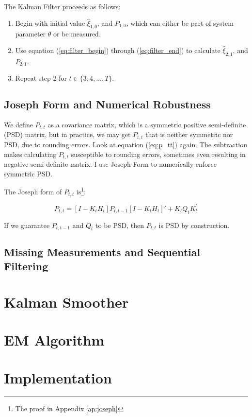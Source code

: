 \documentclass[12pt]{article}
\newenvironment{boenumerate}
    {\begin{enumerate}\renewcommand\labelenumi{\textbf\theenumi}}
    {\end{enumerate}}
\numberwithin{equation}{section}
\begin{document}
The Kalman Filter proceeds as follows:

\begin{boenumerate}
    \item Begin with initial value $\hat{\xi}_{1,0}$, and $P_{1,0}$, which can either be part of system parameter $\theta$ or be measured. 
    \item Use equation (\ref{eq:filter_begin}) through (\ref{eq:filter_end}) to calculate $\hat{\xi}_{2,1}$, and $P_{2,1}$.
    \item Repeat step 2 for $t\in\{3, 4, ..., T\}$.
\end{boenumerate}

\subsection{Joseph Form and Numerical Robustness}

We define $P_{t,t}$ as a covariance matrix, which is a symmetric positive semi-definite (PSD) matrix, but in practice, we may get $P_{t,t}$ that is neither symmetric nor PSD, due to rounding errors. Look at equation (\ref{eq:p_tt}) again. The subtraction makes calculating $P_{t,t}$ susceptible to rounding errors, sometimes even resulting in negative semi-definite matrix. I use Joseph Form to numerically enforce symmetric PSD. 

The Joseph form of $P_{t,t}$ is\footnote{The proof in Appendix \ref{ap:joseph}}:

\[
    P_{t,t} = [I - K_tH_t]P_{t,t-1}[I - K_tH_t]' + K_tQ_tK_t^{'}    
\]

If we guarantee $P_{t,t-1}$ and $Q_t$ to be PSD, then $P_{t,t}$ is PSD by construction. 

\subsection{Missing Measurements and Sequential Filtering}

\section{Kalman Smoother} \label{sec:smoother}

\section{EM Algorithm}

\section{Implementation}
\end{document}
